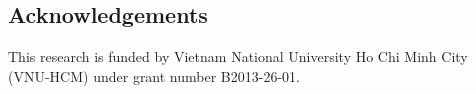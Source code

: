 \documentclass[twocolumn]{bmcart}%
\begin{document}
\begin{backmatter}

\section{Acknowledgements}
This research is funded by Vietnam National University Ho Chi Minh City (VNU-HCM) under grant number B2013-26-01.









\end{backmatter}
\end{document}
